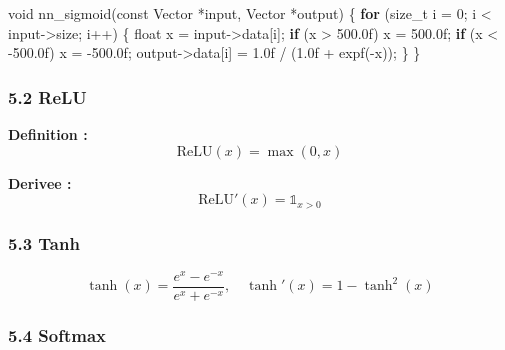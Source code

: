 \documentclass[
  letterpaper,
  DIV=11,
  numbers=noendperiod]{scrartcl}
\newenvironment{Shaded}{\begin{snugshade}}{\end{snugshade}}
\newcommand{\BuiltInTok}[1]{\textcolor[rgb]{0.00,0.23,0.31}{#1}}
\newcommand{\ControlFlowTok}[1]{\textcolor[rgb]{0.00,0.23,0.31}{\textbf{#1}}}
\newcommand{\DataTypeTok}[1]{\textcolor[rgb]{0.68,0.00,0.00}{#1}}
\newcommand{\DecValTok}[1]{\textcolor[rgb]{0.68,0.00,0.00}{#1}}
\newcommand{\FloatTok}[1]{\textcolor[rgb]{0.68,0.00,0.00}{#1}}
\newcommand{\NormalTok}[1]{\textcolor[rgb]{0.00,0.23,0.31}{#1}}
\newcommand{\OperatorTok}[1]{\textcolor[rgb]{0.37,0.37,0.37}{#1}}
\begin{document}
\begin{Shaded}
\begin{Highlighting}[]
\DataTypeTok{void}\NormalTok{ nn\_sigmoid}\OperatorTok{(}\DataTypeTok{const}\NormalTok{ Vector }\OperatorTok{*}\NormalTok{input}\OperatorTok{,}\NormalTok{ Vector }\OperatorTok{*}\NormalTok{output}\OperatorTok{)} \OperatorTok{\{}
    \ControlFlowTok{for} \OperatorTok{(}\DataTypeTok{size\_t}\NormalTok{ i }\OperatorTok{=} \DecValTok{0}\OperatorTok{;}\NormalTok{ i }\OperatorTok{\textless{}}\NormalTok{ input}\OperatorTok{{-}\textgreater{}}\NormalTok{size}\OperatorTok{;}\NormalTok{ i}\OperatorTok{++)} \OperatorTok{\{}
        \DataTypeTok{float}\NormalTok{ x }\OperatorTok{=}\NormalTok{ input}\OperatorTok{{-}\textgreater{}}\NormalTok{data}\OperatorTok{[}\NormalTok{i}\OperatorTok{];}
        \ControlFlowTok{if} \OperatorTok{(}\NormalTok{x }\OperatorTok{\textgreater{}} \FloatTok{500.0}\BuiltInTok{f}\OperatorTok{)}\NormalTok{ x }\OperatorTok{=} \FloatTok{500.0}\BuiltInTok{f}\OperatorTok{;}
        \ControlFlowTok{if} \OperatorTok{(}\NormalTok{x }\OperatorTok{\textless{}} \OperatorTok{{-}}\FloatTok{500.0}\BuiltInTok{f}\OperatorTok{)}\NormalTok{ x }\OperatorTok{=} \OperatorTok{{-}}\FloatTok{500.0}\BuiltInTok{f}\OperatorTok{;}
\NormalTok{        output}\OperatorTok{{-}\textgreater{}}\NormalTok{data}\OperatorTok{[}\NormalTok{i}\OperatorTok{]} \OperatorTok{=} \FloatTok{1.0}\BuiltInTok{f} \OperatorTok{/} \OperatorTok{(}\FloatTok{1.0}\BuiltInTok{f} \OperatorTok{+}\NormalTok{ expf}\OperatorTok{({-}}\NormalTok{x}\OperatorTok{));}
    \OperatorTok{\}}
\OperatorTok{\}}
\end{Highlighting}
\end{Shaded}

\subsubsection{5.2 ReLU}\label{relu}

\textbf{Definition :} \[\text{ReLU}(x) = \max(0, x)\]

\textbf{Derivee :} \[\text{ReLU}'(x) = \mathbb{1}_{x > 0}\]

\subsubsection{5.3 Tanh}\label{tanh}

\[\tanh(x) = \frac{e^x - e^{-x}}{e^x + e^{-x}}, \quad \tanh'(x) = 1 - \tanh^2(x)\]

\subsubsection{5.4 Softmax}\label{softmax}
\end{document}
